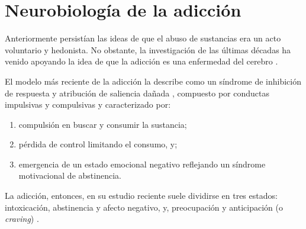 \section{Neurobiología de la adicción}
Anteriormente persistían las ideas de que el abuso de sustancias era un acto voluntario y hedonista.
No obstante, la investigación de las últimas décadas ha venido apoyando la idea de que la adicción es una enfermedad del cerebro \parencite{Volkow2016}.\par
El modelo más reciente de la adicción la describe como un síndrome de inhibición de respuesta y atribución de saliencia dañada \parencite{Goldstein2012a}, compuesto por conductas impulsivas y compulsivas \parencite{Koob2010a} y caracterizado por:
\begin{enumerate}
    \item{compulsión en buscar y consumir la sustancia; }
    \item{pérdida de control limitando el consumo, y; }
    \item{emergencia de un estado emocional negativo reflejando un síndrome motivacional de abstinencia.}
\end{enumerate}
La adicción, entonces, en su estudio reciente suele dividirse en tres estados: intoxicación, abstinencia y afecto negativo, y, preocupación y anticipación (o \textit{craving}) \parencite{Koob2010a,Goldstein2012a,Volkow2016}.

